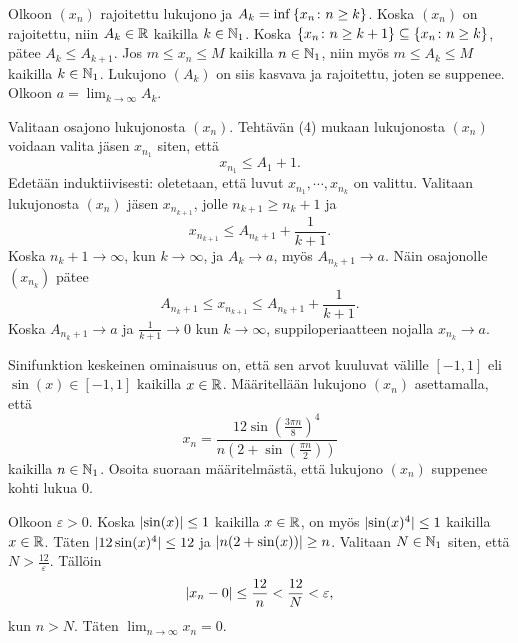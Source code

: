 \documentclass[11pt,a4paper]{amsart}
\begin{document}
\begin{solution}
Olkoon \((x_n)\) rajoitettu lukujono ja \(A_k = \inf{\left\lbrace x_n \colon
n \geq k\right\rbrace}\). Koska \((x_n)\) on rajoitettu, niin \(A_k \in \mathbb{R}\) kaikilla
\(k \in \mathbb{N}_1\). Koska
\(\left\lbrace x_n \colon n \geq k + 1\right\rbrace \subseteq \left\lbrace x_n \colon n \geq k\right\rbrace\),
pätee \(A_k \leq A_{k + 1}\). Jos \(m \leq x_n \leq M\) kaikilla
\(n \in \mathbb{N}_1\), niin myös \(m \leq A_k \leq M\) kaikilla
\(k \in \mathbb{N}_1\). Lukujono \((A_k)\) on siis kasvava ja rajoitettu,
joten se suppenee. Olkoon \(a = \lim_{k \to \infty} A_k\).

Valitaan osajono lukujonosta \((x_n)\). Tehtävän (4) mukaan lukujonosta
\((x_n)\) voidaan valita jäsen \(x_{n_{1}}\) siten, että
\[
x_{n_{1}} \leq A_1 + 1.
\]
Edetään induktiivisesti: oletetaan, että luvut \(x_{n_{1}}, \cdots, x_{n_{k}}\)
on valittu. Valitaan lukujonosta \((x_n)\) jäsen \(x_{n_{k + 1}}\),
jolle \(n_{k + 1} \geq n_{k} + 1\) ja
\[
x_{n_{k + 1}} \leq A_{n_k + 1} + \frac{1}{k + 1}.
\]
Koska \(n_k + 1 \to \infty\), kun \(k \to \infty\), ja \(A_k \to a\),
myös \(A_{n_k + 1} \to a\). Näin osajonolle \((x_{n_{k}})\) pätee
\[
A_{n_k + 1} \leq x_{n_{k + 1}} \leq A_{n_k + 1} + \frac{1}{k + 1}.
\]
Koska \(A_{n_k + 1} \to a\) ja \(\frac{1}{k + 1} \to 0\) kun \(k \to \infty\),
suppiloperiaatteen nojalla \(x_{n_{k}} \to a\).
\end{solution}

\begin{exercise}
Sinifunktion keskeinen ominaisuus on, että sen arvot kuuluvat välille
\([-1, 1]\) eli \(\sin(x) \in [-1, 1]\) kaikilla \(x \in \mathbb{R}\). Määritellään
lukujono \((x_n)\) asettamalla, että
\[
x_n = \frac{12\sin(\frac{3\pi n}{8})^4}{n(2 + \sin(\frac{\pi n}{2}))}
\]
kaikilla \(n \in \mathbb{N}_1\). Osoita suoraan määritelmästä, että lukujono \((x_n)\)
suppenee kohti lukua \(0\).
\end{exercise}

\begin{solution}
Olkoon \(\varepsilon > 0\). Koska \(\lvert\sin(x)\rvert \leq 1\) kaikilla \(x \in \mathbb{R}\),
on myös \(\lvert\sin(x)^4\rvert \leq 1\) kaikilla \(x \in \mathbb{R}\). Täten
\(\lvert12\sin(x)^4\rvert \leq 12\) ja \(\lvert n(2 + \sin(x))\rvert \geq n\).
Valitaan \(N \in \mathbb{N}_1\) siten, että \(N > \frac{12}{\varepsilon}\). Tällöin
\[
\lvert x_n - 0\rvert \leq \frac{12}{n} < \frac{12}{N} < \varepsilon,
\]
kun \(n > N\). Täten \(\lim_{n \to \infty} x_n = 0\).
\end{solution}
\end{document}
